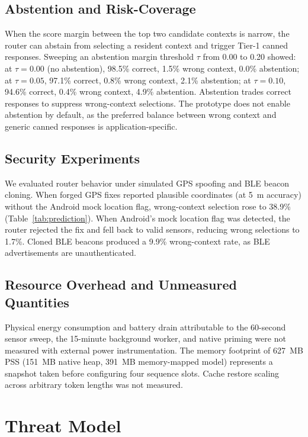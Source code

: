 \documentclass[conference]{IEEEtran}
\begin{document}
\subsection{Abstention and Risk-Coverage}
\label{sec:eval_risk}
When the score margin between the top two candidate contexts is narrow, the router can abstain from selecting a resident context and trigger Tier-1 canned responses. Sweeping an abstention margin threshold $\tau$ from 0.00 to 0.20 showed: at $\tau = 0.00$ (no abstention), 98.5\% correct, 1.5\% wrong context, 0.0\% abstention; at $\tau = 0.05$, 97.1\% correct, 0.8\% wrong context, 2.1\% abstention; at $\tau = 0.10$, 94.6\% correct, 0.4\% wrong context, 4.9\% abstention. Abstention trades correct responses to suppress wrong-context selections. The prototype does not enable abstention by default, as the preferred balance between wrong context and generic canned responses is application-specific.

\subsection{Security Experiments}
\label{sec:eval_security}
We evaluated router behavior under simulated GPS spoofing and BLE beacon cloning. When forged GPS fixes reported plausible coordinates (at 5~m accuracy) without the Android mock location flag, wrong-context selection rose to 38.9\% (Table~\ref{tab:prediction}). When Android's mock location flag was detected, the router rejected the fix and fell back to valid sensors, reducing wrong selections to 1.7\%. Cloned BLE beacons produced a 9.9\% wrong-context rate, as BLE advertisements are unauthenticated.

\subsection{Resource Overhead and Unmeasured Quantities}
\label{sec:eval_unmeasured}
Physical energy consumption and battery drain attributable to the 60-second sensor sweep, the 15-minute background worker, and native priming were not measured with external power instrumentation. The memory footprint of 627~MB PSS (151~MB native heap, 391~MB memory-mapped model) represents a snapshot taken before configuring four sequence slots. Cache restore scaling across arbitrary token lengths was not measured.

\section{Threat Model}
\label{sec:threat}
\end{document}
